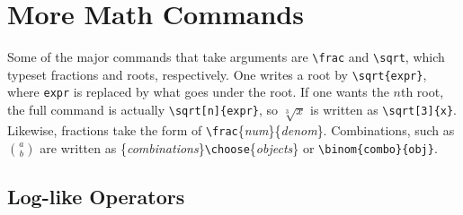 \section{More Math Commands}
\label{sec:more-math-commands}

Some of the major commands that take arguments are \verb?\frac? and
\verb?\sqrt?, which typeset fractions and roots, respectively.  One
writes a root by \verb?\sqrt{expr}?, where \texttt{expr} is replaced
by what goes under the root.  If one wants the $n$th root, the full
command is actually \verb?\sqrt[n]{expr}?, so $\sqrt[3]{x}$ is written
as \verb?\sqrt[3]{x}?.  Likewise, fractions take the form of
\verb?\frac?\{\textit{num}\}\{\textit{denom}\}.  Combinations, such as
$\binom{a}{b}$ are written as
\{\textit{combinations}\}\verb?\choose?\{\textit{objects}\} or
\verb?\binom{combo}{obj}?.

\subsection{Log-like Operators}
\label{sec:log-like-operators}

